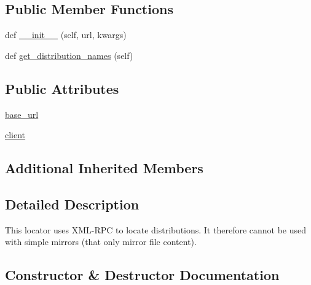 \subsection*{Public Member Functions}
\begin{DoxyCompactItemize}
\item 
def \hyperlink{classpip_1_1__vendor_1_1distlib_1_1locators_1_1PyPIRPCLocator_a7893d9456fc0bb2b52e1bb49f13fa51a}{\+\_\+\+\_\+init\+\_\+\+\_\+} (self, url, kwargs)
\item 
def \hyperlink{classpip_1_1__vendor_1_1distlib_1_1locators_1_1PyPIRPCLocator_af4dff2cf7d93a6edbad60de3022b5727}{get\+\_\+distribution\+\_\+names} (self)
\end{DoxyCompactItemize}
\subsection*{Public Attributes}
\begin{DoxyCompactItemize}
\item 
\hyperlink{classpip_1_1__vendor_1_1distlib_1_1locators_1_1PyPIRPCLocator_ab66e304ed3fabe34d0f19cbe5900d8c7}{base\+\_\+url}
\item 
\hyperlink{classpip_1_1__vendor_1_1distlib_1_1locators_1_1PyPIRPCLocator_a718d3f06b8b4112ee233925a0160d36f}{client}
\end{DoxyCompactItemize}
\subsection*{Additional Inherited Members}


\subsection{Detailed Description}
\begin{DoxyVerb}This locator uses XML-RPC to locate distributions. It therefore
cannot be used with simple mirrors (that only mirror file content).
\end{DoxyVerb}
 

\subsection{Constructor \& Destructor Documentation}
\mbox{\label{classpip_1_1__vendor_1_1distlib_1_1locators_1_1PyPIRPCLocator_a7893d9456fc0bb2b52e1bb49f13fa51a}} 
